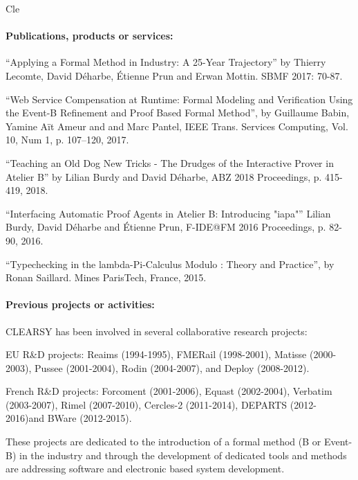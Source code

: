 \begin{sitedescription}{Cle}
\paragraph*{Publications, products or services:}

\begin{compactitem}
\item ``Applying a Formal Method in Industry: A 25-Year Trajectory'' by Thierry Lecomte, David Déharbe, Étienne Prun and Erwan Mottin.
SBMF 2017: 70-87.
\item ``Web Service Compensation at Runtime: Formal Modeling and Verification Using the Event-B Refinement and Proof Based Formal Method'', by Guillaume Babin, Yamine Aït Ameur and and Marc Pantel, IEEE Trans. Services Computing, Vol. 10, Num 1, p. 107--120, 2017.
\item ``Teaching an Old Dog New Tricks - The Drudges of the Interactive Prover in Atelier B'' by Lilian Burdy and David Déharbe, ABZ 2018 Proceedings, p. 415-419, 2018.
\item ``Interfacing Automatic Proof Agents in Atelier B: Introducing "iapa"'' Lilian Burdy, David Déharbe and Étienne Prun, F-IDE@FM 2016 Proceedings, p. 82-90, 2016.
\item ``Typechecking in the lambda-Pi-Calculus Modulo : Theory and Practice'', by Ronan Saillard. Mines ParisTech, France, 2015.
\end{compactitem}

\paragraph*{Previous projects or activities:}

CLEARSY has been involved in several collaborative research projects:
\begin{compactitem}
\item EU R\&D projects: Reaims (1994-1995), FMERail (1998-2001), Matisse (2000-2003), Pussee (2001-2004), Rodin (2004-2007), and Deploy (2008-2012).
\item French R\&D projects: Forcoment (2001-2006), Equast (2002-2004), Verbatim (2003-2007), Rimel (2007-2010), Cercles-2 (2011-2014), DEPARTS (2012-2016)and BWare (2012-2015).
\end{compactitem}

These projects are dedicated to the introduction of a formal method (B or Event-B) in the industry and through the development
of dedicated tools and methods are addressing software and electronic based system development.


\end{sitedescription}
